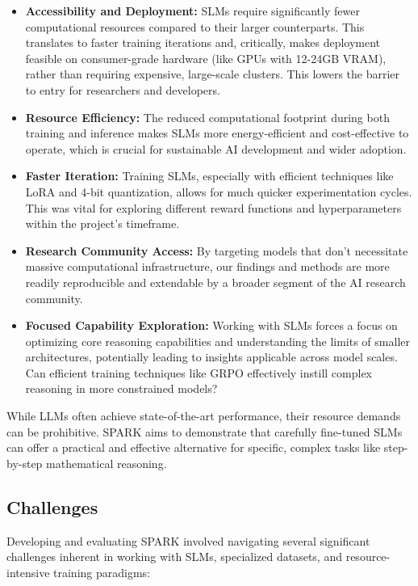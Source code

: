 \documentclass[11pt]{article}
\begin{document}
\begin{itemize}
\begin{itemize}
    \item \textbf{Accessibility and Deployment:} SLMs require significantly fewer computational resources compared to their larger counterparts. This translates to faster training iterations and, critically, makes deployment feasible on consumer-grade hardware (like GPUs with 12-24GB VRAM), rather than requiring expensive, large-scale clusters. This lowers the barrier to entry for researchers and developers.
    \item \textbf{Resource Efficiency:} The reduced computational footprint during both training and inference makes SLMs more energy-efficient and cost-effective to operate, which is crucial for sustainable AI development and wider adoption.
    \item \textbf{Faster Iteration:} Training SLMs, especially with efficient techniques like LoRA and 4-bit quantization, allows for much quicker experimentation cycles. This was vital for exploring different reward functions and hyperparameters within the project's timeframe.
    \item \textbf{Research Community Access:} By targeting models that don't necessitate massive computational infrastructure, our findings and methods are more readily reproducible and extendable by a broader segment of the AI research community.
    \item \textbf{Focused Capability Exploration:} Working with SLMs forces a focus on optimizing core reasoning capabilities and understanding the limits of smaller architectures, potentially leading to insights applicable across model scales. Can efficient training techniques like GRPO effectively instill complex reasoning in more constrained models?
\end{itemize}
While LLMs often achieve state-of-the-art performance, their resource demands can be prohibitive. SPARK aims to demonstrate that carefully fine-tuned SLMs can offer a practical and effective alternative for specific, complex tasks like step-by-step mathematical reasoning.

\subsection{Challenges} %
Developing and evaluating SPARK involved navigating several significant challenges inherent in working with SLMs, specialized datasets, and resource-intensive training paradigms:


\end{itemize}
\end{document}
